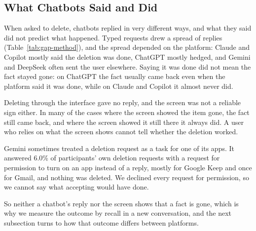 \documentclass[conference,compsoc]{IEEEtran}
\begin{document}
\subsection{What Chatbots Said and Did}
\label{sec:audit-said-did}
When asked to delete, chatbots replied in very different ways, and what they said did not predict what happened.
Typed requests drew a spread of replies (Table~\ref{tab:gap-method}), and the spread depended on the platform: Claude and Copilot mostly said the deletion was done, ChatGPT mostly hedged, and Gemini and DeepSeek often sent the user elsewhere.
Saying it was done did not mean the fact stayed gone: on ChatGPT the fact usually came back even when the platform said it was done, while on Claude and Copilot it almost never did.

Deleting through the interface gave no reply, and the screen was not a reliable sign either.
In many of the cases where the screen showed the item gone, the fact still came back, and where the screen showed it still there it always did.
A user who relies on what the screen shows cannot tell whether the deletion worked.

Gemini sometimes treated a deletion request as a task for one of its apps.
It answered 6.0\% of participants' own deletion requests with a request for permission to turn on an app instead of a reply, mostly for Google Keep and once for Gmail, and nothing was deleted.
We declined every request for permission, so we cannot say what accepting would have done.

So neither a chatbot's reply nor the screen shows that a fact is gone, which is why we measure the outcome by recall in a new conversation, and the next subsection turns to how that outcome differs between platforms.
\end{document}
